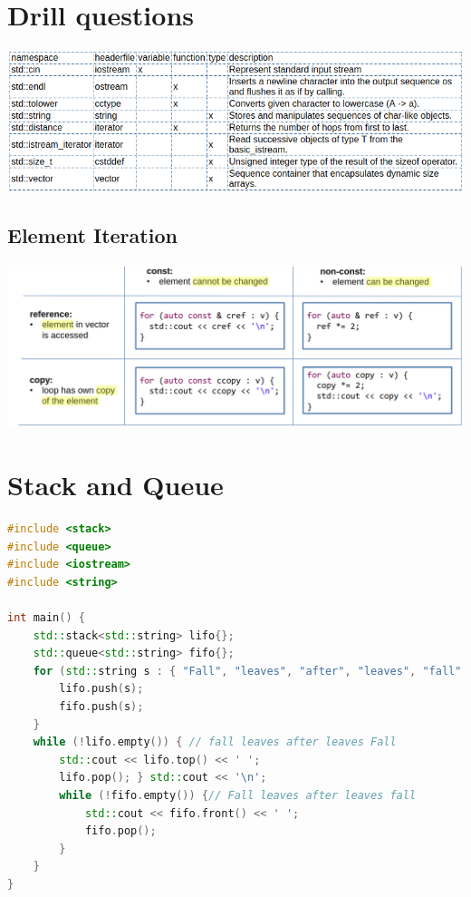 

\newcommand{\SUBJECT}{Codebeispiele}
\newcommand{\TITLE}{C++}



\lstset{style=cevelop-style}


\section{Drill questions}
\includegraphics[keepaspectratio,width=\textwidth,height=\textheigh t]{images/1}
\subsection{Element Iteration}
\includegraphics[keepaspectratio,width=\textwidth,height=\textheigh t]{images/2}
\section{Stack and Queue}
\begin{lstlisting}[language=C++]
#include <stack> 
#include <queue> 
#include <iostream> 
#include <string> 

int main() { 
	std::stack<std::string> lifo{}; 
	std::queue<std::string> fifo{}; 
	for (std::string s : { "Fall", "leaves", "after", "leaves", "fall" }) { 
		lifo.push(s); 
		fifo.push(s); 
	} 
	while (!lifo.empty()) { // fall leaves after leaves Fall 
		std::cout << lifo.top() << ' '; 
		lifo.pop(); } std::cout << '\n'; 
		while (!fifo.empty()) {// Fall leaves after leaves fall 
			std::cout << fifo.front() << ' '; 
			fifo.pop(); 
		} 
	} 
}
\end{lstlisting}
